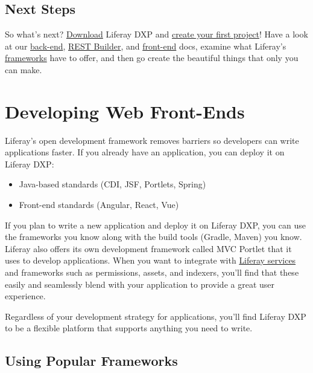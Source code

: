 \section{Next Steps}\label{next-steps}

So what's next? \href{/download}{Download} Liferay DXP and
\href{/docs/7-2/reference/-/knowledge_base/r/creating-a-project}{create
your first project}! Have a look at our
\href{/docs/7-2/appdev/-/knowledge_base/a/service-builder}{back-end},
\href{/docs/7-2/appdev/-/knowledge_base/a/rest-builder}{REST Builder},
and \href{/docs/7-2/appdev/-/knowledge_base/a/web-front-ends}{front-end}
docs, examine what Liferay's
\href{/docs/7-2/frameworks/-/knowledge_base/f/frameworks}{frameworks}
have to offer, and then go create the beautiful things that only you can
make.

\chapter{Developing Web Front-Ends}\label{developing-web-front-ends}

Liferay's open development framework removes barriers so developers can
write applications faster. If you already have an application, you can
deploy it on Liferay DXP:

\begin{itemize}
\tightlist
\item
  Java-based standards (CDI, JSF, Portlets, Spring)
\item
  Front-end standards (Angular, React, Vue)
\end{itemize}

If you plan to write a new application and deploy it on Liferay DXP, you
can use the frameworks you know along with the build tools (Gradle,
Maven) you know. Liferay also offers its own development framework
called MVC Portlet that it uses to develop applications. When you want
to integrate with
\href{/docs/7-2/appdev/-/knowledge_base/a/service-builder}{Liferay
services} and frameworks such as permissions, assets, and indexers,
you'll find that these easily and seamlessly blend with your application
to provide a great user experience.

Regardless of your development strategy for applications, you'll find
Liferay DXP to be a flexible platform that supports anything you need to
write.

\section{Using Popular Frameworks}\label{using-popular-frameworks}

